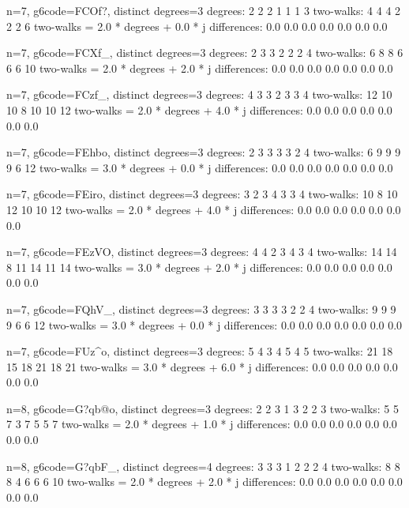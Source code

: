 n=7, g6code=FCOf?, distinct degrees=3
degrees: 2 2 2 1 1 1 3 
two-walks: 4 4 4 2 2 2 6 
two-walks = 2.0 * degrees + 0.0 * j
differences: 0.0 0.0 0.0 0.0 0.0 0.0 0.0 

n=7, g6code=FCXf_, distinct degrees=3
degrees: 2 3 3 2 2 2 4 
two-walks: 6 8 8 6 6 6 10 
two-walks = 2.0 * degrees + 2.0 * j
differences: 0.0 0.0 0.0 0.0 0.0 0.0 0.0 

n=7, g6code=FCzf_, distinct degrees=3
degrees: 4 3 3 2 3 3 4 
two-walks: 12 10 10 8 10 10 12 
two-walks = 2.0 * degrees + 4.0 * j
differences: 0.0 0.0 0.0 0.0 0.0 0.0 0.0 

n=7, g6code=FEhbo, distinct degrees=3
degrees: 2 3 3 3 3 2 4 
two-walks: 6 9 9 9 9 6 12 
two-walks = 3.0 * degrees + 0.0 * j
differences: 0.0 0.0 0.0 0.0 0.0 0.0 0.0 

n=7, g6code=FEiro, distinct degrees=3
degrees: 3 2 3 4 3 3 4 
two-walks: 10 8 10 12 10 10 12 
two-walks = 2.0 * degrees + 4.0 * j
differences: 0.0 0.0 0.0 0.0 0.0 0.0 0.0 

n=7, g6code=FEzVO, distinct degrees=3
degrees: 4 4 2 3 4 3 4 
two-walks: 14 14 8 11 14 11 14 
two-walks = 3.0 * degrees + 2.0 * j
differences: 0.0 0.0 0.0 0.0 0.0 0.0 0.0 

n=7, g6code=FQhV_, distinct degrees=3
degrees: 3 3 3 3 2 2 4 
two-walks: 9 9 9 9 6 6 12 
two-walks = 3.0 * degrees + 0.0 * j
differences: 0.0 0.0 0.0 0.0 0.0 0.0 0.0 

n=7, g6code=FUz^o, distinct degrees=3
degrees: 5 4 3 4 5 4 5 
two-walks: 21 18 15 18 21 18 21 
two-walks = 3.0 * degrees + 6.0 * j
differences: 0.0 0.0 0.0 0.0 0.0 0.0 0.0 

n=8, g6code=G?qb@o, distinct degrees=3
degrees: 2 2 3 1 3 2 2 3 
two-walks: 5 5 7 3 7 5 5 7 
two-walks = 2.0 * degrees + 1.0 * j
differences: 0.0 0.0 0.0 0.0 0.0 0.0 0.0 0.0 

n=8, g6code=G?qbF_, distinct degrees=4
degrees: 3 3 3 1 2 2 2 4 
two-walks: 8 8 8 4 6 6 6 10 
two-walks = 2.0 * degrees + 2.0 * j
differences: 0.0 0.0 0.0 0.0 0.0 0.0 0.0 0.0 

